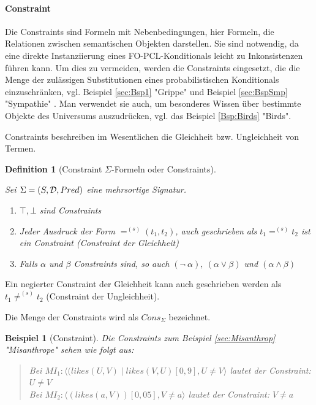 \documentclass[draft]{scrreprt}
\newtheorem{Def}{Definition }[section]
\newtheorem{Bsp}{Beispiel}[section]
\begin{document}
\paragraph{Constraint}  \label{constraint}

Die Constraints  sind Formeln mit Nebenbedingungen, hier Formeln, die Relationen zwischen semantischen Objekten darstellen. Sie sind notwendig, da eine direkte Instanziierung eines FO-PCL-Konditionals  leicht zu Inkonsistenzen führen kann. Um dies zu vermeiden, werden die Constraints eingesetzt, die die Menge der zulässigen Substitutionen eines probabilistischen Konditionals  einzuschränken, vgl. Beispiel \ref{sec:Bsp1} "{}Grippe"{}  und Beispiel \ref{sec:BspSmp} "{}Sympathie"{} . Man verwendet sie auch, um besonderes Wissen über bestimmte Objekte des Universums auszudrücken, vgl. das Beispiel \ref{Bsp:Birds} "{}Birds"{}.

\noindent
Constraints beschreiben im Wesentlichen die Gleichheit bzw. Ungleichheit von Termen.

\begin{Def}[Constraint $ \Sigma $-Formeln oder Constraints]\cite[Kap. 6.2, S. 126/127 vgl. Def. 6.2.4]{Fis10} \label{Def:Constraint}
		
\noindent
Sei $ \Sigma = (S, {\cal D}, Pred) $ eine mehrsortige Signatur.
\begin{enumerate}
\renewcommand{\labelenumi}{\textnormal{(\theenumi)}}
\item {$ \top, \bot $ sind  Constraints}
\item {Jeder Ausdruck der Form $ =^{(s)} (t_1, t_2)$, auch geschrieben als $ t_1 =^{(s)} t_2 $} ist ein Constraint (Constraint der Gleichheit)
\item{Falls $ \alpha $ und $ \beta $ Constraints sind, so auch $  (\neg ~ \alpha),~  (\alpha \vee \beta)$ und $ (\alpha \wedge \beta)  $} 
\end{enumerate}
\end{Def}
Ein negierter Constraint der Gleichheit kann auch geschrieben werden als $ t_1 \not=^{(s)} t_2 $ (Constraint der Ungleichheit). 

\noindent
Die Menge der Constraints wird als $ Cons_{\Sigma} $  bezeichnet.


\begin{Bsp}[Constraint] \label{Bsp:Constraint}
	Die Constraints zum Beispiel \ref{sec:Misanthrop} "{}Misanthrope"{} sehen wie folgt aus:\\
	\begin{quote}
	Bei	$ MI_1 : \langle (likes(U, V) \mid likes(V, U)[0,9], U \neq V \rangle$ lautet der Constraint: $  U \neq V  $\\
	Bei	$ MI_2 : \langle (likes(a, V))[0,05], V \neq a \rangle$ lautet der Constraint: $  V \neq a  $\\
	\end{quote}
\end{Bsp}
\end{document}
